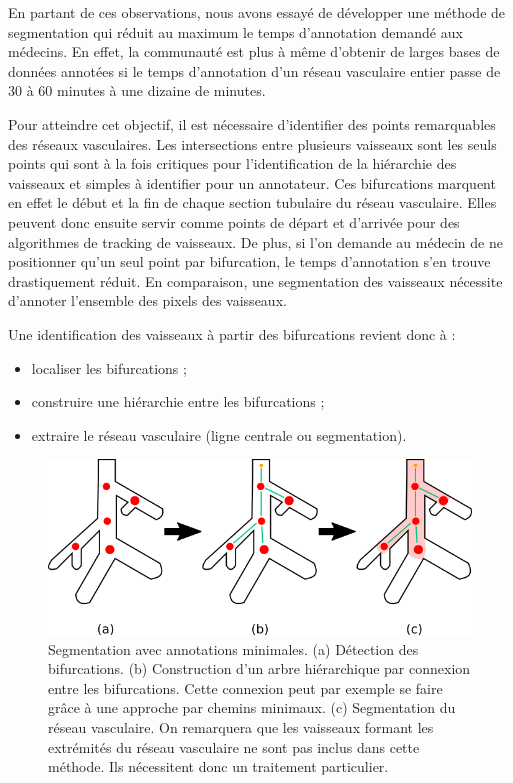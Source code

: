 En partant de ces observations, nous avons essayé de développer une méthode de segmentation qui réduit au maximum le temps d'annotation demandé aux médecins. En effet, la communauté est plus à même d'obtenir de larges bases de données annotées si le temps d'annotation d'un réseau vasculaire entier passe de 30 à 60 minutes à une dizaine de minutes. 

Pour atteindre cet objectif, il est nécessaire d'identifier des points remarquables des réseaux vasculaires. Les intersections entre plusieurs vaisseaux sont les seuls points qui sont à la fois critiques pour l'identification de la hiérarchie des vaisseaux et simples à identifier pour un annotateur. Ces bifurcations marquent en effet le début et la fin de chaque section tubulaire du réseau vasculaire. Elles peuvent donc ensuite servir comme points de départ et d'arrivée pour des algorithmes de tracking de vaisseaux.  De plus, si l'on demande au médecin de ne positionner qu'un seul point par bifurcation, le temps d'annotation s'en trouve drastiquement réduit. En comparaison, une segmentation des vaisseaux nécessite d'annoter l'ensemble des pixels des vaisseaux.
 
Une identification des vaisseaux à partir des bifurcations revient donc à :

\begin{itemize}
\item localiser les bifurcations ;
\item construire une hiérarchie entre les bifurcations ;
\item extraire le réseau vasculaire (ligne centrale ou segmentation).
\end{itemize}

\begin{figure}[!ht]
    \centering
    \includegraphics[width=\textwidth]{Images/thrifty_annotations.png}
    \caption{Segmentation avec annotations minimales. (a) Détection des bifurcations. (b) Construction d'un arbre hiérarchique par connexion entre les bifurcations. Cette connexion peut par exemple se faire grâce à une approche par chemins minimaux. (c) Segmentation du réseau vasculaire. On remarquera que les vaisseaux formant les extrémités du réseau vasculaire ne sont pas inclus dans cette méthode. Ils nécessitent donc un traitement particulier.}
    \label{fig:thrifty}
  \end{figure}

